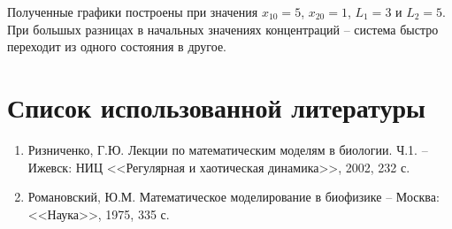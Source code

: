Полученные графики построены при значения \( x_{10} = 5 \), \( x_{20} = 1 \), 
\( L_1 = 3 \) и \( L_2 = 5 \). При большых разницах в начальных значениях
концентраций -- система быстро переходит из одного состояния в другое. 

\newpage

\section{Список использованной литературы}
    \begin{enumerate}
        \item Ризниченко, Г.Ю. Лекции по математическим моделям в 
            биологии. Ч.1. -- Ижевск: НИЦ
            <<Регулярная и хаотическая динамика>>, 2002, 232 с.
        \item Романовский, Ю.М. Математическое моделирование в биофизике
            -- Москва: <<Наука>>, 1975, 335 с.
    \end{enumerate}